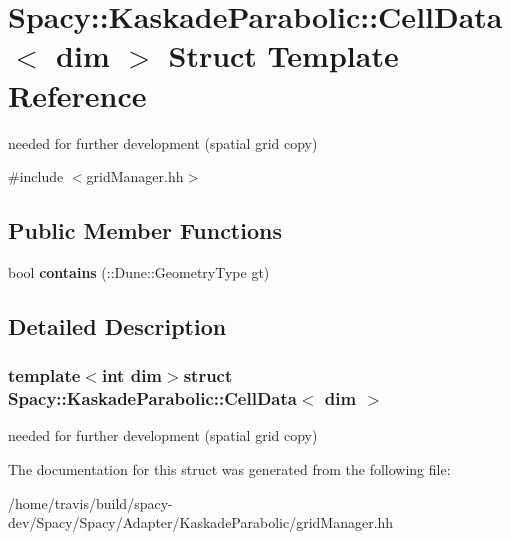 \hypertarget{structSpacy_1_1KaskadeParabolic_1_1CellData}{\section{Spacy\-:\-:Kaskade\-Parabolic\-:\-:Cell\-Data$<$ dim $>$ Struct Template Reference}
\label{structSpacy_1_1KaskadeParabolic_1_1CellData}
}


needed for further development (spatial grid copy)  




{\ttfamily \#include $<$grid\-Manager.\-hh$>$}

\subsection*{Public Member Functions}
\begin{DoxyCompactItemize}
\item 
\hypertarget{structSpacy_1_1KaskadeParabolic_1_1CellData_a0dfc009b745b0c419d823e5effbaf788}{bool {\bfseries contains} (\-::Dune\-::\-Geometry\-Type gt)}\label{structSpacy_1_1KaskadeParabolic_1_1CellData_a0dfc009b745b0c419d823e5effbaf788}

\end{DoxyCompactItemize}


\subsection{Detailed Description}
\subsubsection*{template$<$int dim$>$struct Spacy\-::\-Kaskade\-Parabolic\-::\-Cell\-Data$<$ dim $>$}

needed for further development (spatial grid copy) 

The documentation for this struct was generated from the following file\-:\begin{DoxyCompactItemize}
\item 
/home/travis/build/spacy-\/dev/\-Spacy/\-Spacy/\-Adapter/\-Kaskade\-Parabolic/grid\-Manager.\-hh\end{DoxyCompactItemize}
